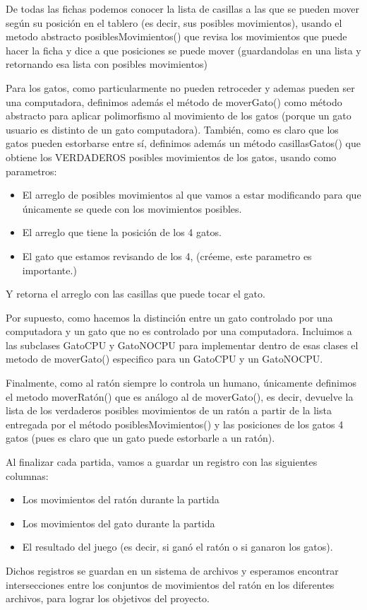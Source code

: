 \documentclass[12pt, Tahoma]{article}
\begin{document}
	De todas las fichas podemos conocer la lista de casillas a las que se pueden mover según su posición en el tablero (es decir, sus posibles movimientos), usando el metodo abstracto posiblesMovimientos() que revisa los movimientos que puede hacer la ficha y dice a que posiciones se puede mover (guardandolas en una lista y retornando esa lista con posibles movimientos)
	
	Para los gatos, como particularmente no pueden retroceder y ademas pueden ser una computadora, definimos además el método de moverGato() como método abstracto para aplicar polimorfismo al movimiento de los gatos (porque un gato usuario es distinto de un gato computadora). También, como es claro que los gatos pueden estorbarse entre sí, definimos además un método casillasGatos() que obtiene los VERDADEROS posibles movimientos de los gatos, usando como parametros: 
	\begin{itemize}
		\item El arreglo de posibles movimientos al que vamos a estar modificando para que únicamente se quede con los movimientos posibles.
		\item El arreglo que tiene la posición de los 4 gatos.
		\item El gato que estamos revisando de los 4, (créeme, este parametro es importante.)
	\end{itemize}
	Y retorna el arreglo con las casillas que puede tocar el gato.
	
	Por supuesto, como hacemos la distinción entre un gato controlado por una computadora y un gato que no es controlado por una computadora. Incluimos a las subclases GatoCPU y GatoNOCPU para implementar dentro de esas clases el metodo de moverGato() especifico para un GatoCPU y un GatoNOCPU.
	
	Finalmente, como al ratón siempre lo controla un humano, únicamente definimos el metodo moverRatón() que es análogo al de moverGato(), es decir, devuelve la lista de los verdaderos posibles movimientos de un ratón a partir de la lista entregada por el método posiblesMovimientos() y las posiciones de los gatos 4 gatos (pues es claro que un gato puede estorbarle a un ratón).
	
	Al finalizar cada partida, vamos a guardar un registro con las siguientes columnas:
	\begin{itemize}
		\item Los movimientos del ratón durante la partida
		\item Los movimientos del gato durante la partida
		\item El resultado del juego (es decir, si ganó el ratón o si ganaron los gatos).
	\end{itemize}
	
	Dichos registros se guardan en un sistema de archivos y esperamos encontrar intersecciones entre los conjuntos de movimientos del ratón en los diferentes archivos, para lograr los objetivos del proyecto. 
\end{document}
